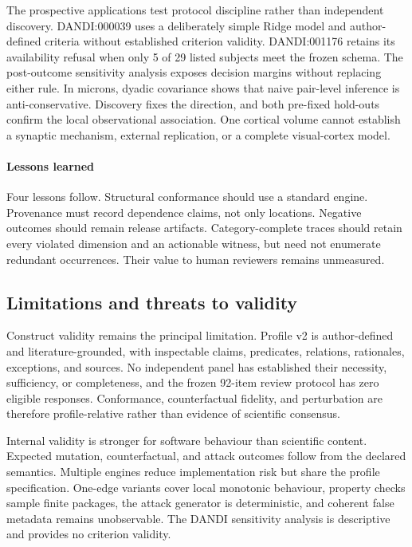 The prospective applications test protocol discipline rather than independent discovery. DANDI:000039 uses a deliberately simple Ridge model and author-defined criteria without established criterion validity. DANDI:001176 retains its availability refusal when only 5 of 29 listed subjects meet the frozen schema. The post-outcome sensitivity analysis exposes decision margins without replacing either rule. In \ac{microns}, dyadic covariance shows that naive pair-level inference is anti-conservative. Discovery fixes the direction, and both pre-fixed hold-outs confirm the local observational association. One cortical volume cannot establish a synaptic mechanism, external replication, or a complete visual-cortex model.

\paragraph{Lessons learned}\label{par:lessons-learned}
Four lessons follow. Structural conformance should use a standard engine. Provenance must record dependence claims, not only locations. Negative outcomes should remain release artifacts. Category-complete traces should retain every violated dimension and an actionable witness, but need not enumerate redundant occurrences. Their value to human reviewers remains unmeasured.

\subsection{Limitations and threats to validity}
\label{subsec:limitations}

Construct validity remains the principal limitation. Profile v2 is author-defined and literature-grounded, with inspectable claims, predicates, relations, rationales, exceptions, and sources. No independent panel has established their necessity, sufficiency, or completeness, and the frozen 92-item review protocol has zero eligible responses. Conformance, counterfactual fidelity, and perturbation are therefore profile-relative rather than evidence of scientific consensus.

Internal validity is stronger for software behaviour than scientific content. Expected mutation, counterfactual, and attack outcomes follow from the declared semantics. Multiple engines reduce implementation risk but share the profile specification. One-edge variants cover local monotonic behaviour, property checks sample finite packages, the attack generator is deterministic, and coherent false metadata remains unobservable. The DANDI sensitivity analysis is descriptive and provides no criterion validity.

